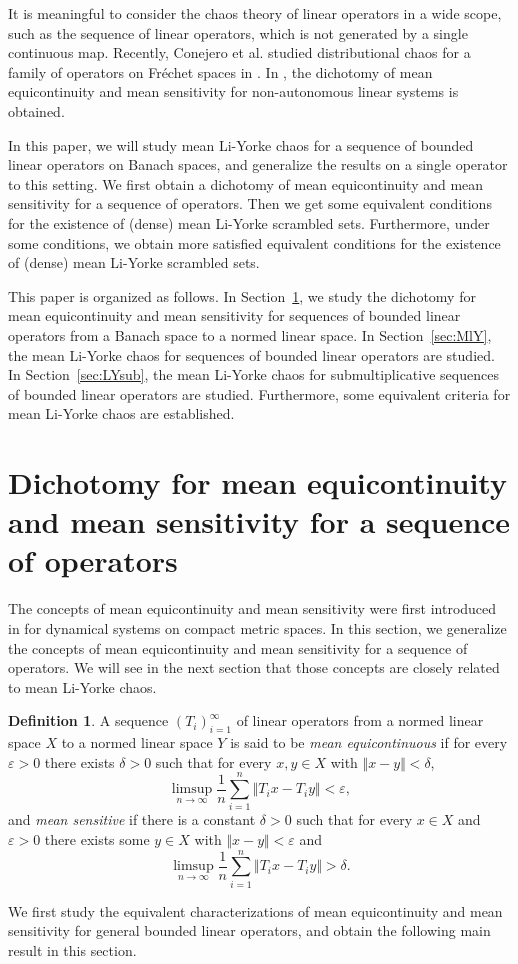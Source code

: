 \documentclass[12pt,a4paper]{amsart}
\theoremstyle{definition}
\newtheorem{defn}{Definition}[section]
\theoremstyle{plain}
\begin{document}
It is meaningful to consider the chaos theory of linear operators in a wide scope, such as the sequence of linear operators, which is not generated by a single continuous map. 
Recently, Conejero et al. studied distributional chaos for a family of operators on Fr\'echet spaces in \cite{CKMM2016}. In \cite{YHC2023}, the dichotomy of mean equicontinuity and mean sensitivity for non-autonomous linear systems is obtained.

In this paper, we will study mean Li-Yorke chaos for a sequence of bounded linear operators on Banach spaces, and generalize the results on a single operator to this setting.
We first obtain a  dichotomy of mean equicontinuity and mean sensitivity for
a sequence of operators.
Then we get some equivalent conditions for the existence of (dense) mean Li-Yorke scrambled sets.
Furthermore, under some conditions, we obtain more satisfied  equivalent conditions for the existence of (dense) mean Li-Yorke scrambled sets.

This paper is organized as follows. In Section~\ref{sec:me&ms}, we study the dichotomy for mean equicontinuity and mean sensitivity for sequences of bounded linear operators from a Banach space to a normed linear space. 
In Section~\ref{sec:MlY}, the mean Li-Yorke chaos for sequences of bounded linear operators are studied. 
In Section~\ref{sec:LYsub}, the mean Li-Yorke chaos for submultiplicative sequences of bounded linear operators are studied. 
Furthermore, some equivalent criteria for mean Li-Yorke chaos are established.

\section{Dichotomy for mean equicontinuity and mean sensitivity for a  sequence of operators}\label{sec:me&ms}

The concepts of  mean equicontinuity and mean sensitivity were first introduced in \cite{LTY2015} for dynamical systems on compact metric spaces.
In this section, we generalize the concepts of  mean equicontinuity and mean sensitivity for a sequence of operators. We will see in the next section that those concepts are closely related to mean Li-Yorke chaos.
\begin{defn}
    A sequence  $(T_i)_{i=1}^{\infty}$ of linear operators from a normed linear space $X$ to a normed linear space $Y$ is said to be
    \emph{mean equicontinuous} if for every $\varepsilon>0$ there exists $\delta>0$ such that for every $x,y\in X$ with $\Vert x-y\Vert<\delta$,
    \[
        \limsup_{n\to\infty}\frac{1}{n}\sum_{i=1}^{n}\Vert T_ix-T_iy\Vert<\varepsilon,
    \]
    and  \emph{mean sensitive} if  there is a constant $\delta>0$ such that for every $x\in X$ and $\varepsilon>0$ there exists some $y\in X$ with $\Vert x-y\Vert<\varepsilon$ and
    \[
        \limsup_{n\to\infty}\frac{1}{n}\sum_{i=1}^{n}\Vert T_ix-T_iy\Vert>\delta.
    \]
\end{defn}
We first study the equivalent characterizations of mean equicontinuity and mean sensitivity for general bounded linear operators, and obtain the following %
main result in this section.
\end{document}
